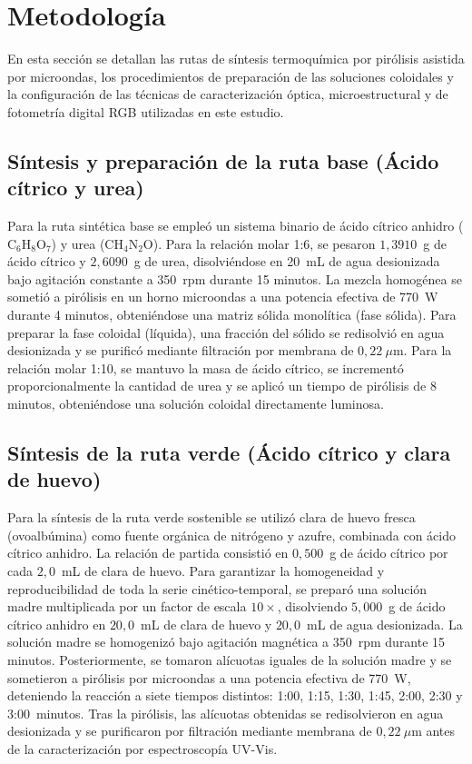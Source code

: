 \section{Metodología}

En esta sección se detallan las rutas de síntesis termoquímica por pirólisis asistida por microondas, los procedimientos de preparación de las soluciones coloidales y la configuración de las técnicas de caracterización óptica, microestructural y de fotometría digital RGB utilizadas en este estudio.

\subsection{Síntesis y preparación de la ruta base (Ácido cítrico y urea)}
Para la ruta sintética base se empleó un sistema binario de ácido cítrico anhidro ($\text{C}_6\text{H}_8\text{O}_7$) y urea ($\text{CH}_4\text{N}_2\text{O}$). Para la relación molar 1:6, se pesaron $1{,}3910$~g de ácido cítrico y $2{,}6090$~g de urea, disolviéndose en 20~mL de agua desionizada bajo agitación constante a 350~rpm durante 15 minutos. La mezcla homogénea se sometió a pirólisis en un horno microondas a una potencia efectiva de 770~W durante 4 minutos, obteniéndose una matriz sólida monolítica (fase sólida). Para preparar la fase coloidal (líquida), una fracción del sólido se redisolvió en agua desionizada y se purificó mediante filtración por membrana de $0{,}22~\mu$m.
Para la relación molar 1:10, se mantuvo la masa de ácido cítrico, se incrementó proporcionalmente la cantidad de urea y se aplicó un tiempo de pirólisis de 8 minutos, obteniéndose una solución coloidal directamente luminosa.

\subsection{Síntesis de la ruta verde (Ácido cítrico y clara de huevo)}
Para la síntesis de la ruta verde sostenible se utilizó clara de huevo fresca (ovoalbúmina) como fuente orgánica de nitrógeno y azufre, combinada con ácido cítrico anhidro. La relación de partida consistió en $0{,}500$~g de ácido cítrico por cada $2{,}0$~mL de clara de huevo. Para garantizar la homogeneidad y reproducibilidad de toda la serie cinético-temporal, se preparó una solución madre multiplicada por un factor de escala $10\times$, disolviendo $5{,}000$~g de ácido cítrico anhidro en $20{,}0$~mL de clara de huevo y $20{,}0$~mL de agua desionizada. La solución madre se homogenizó bajo agitación magnética a 350~rpm durante 15 minutos.
Posteriormente, se tomaron alícuotas iguales de la solución madre y se sometieron a pirólisis por microondas a una potencia efectiva de 770~W, deteniendo la reacción a siete tiempos distintos: 1:00, 1:15, 1:30, 1:45, 2:00, 2:30 y 3:00~minutos. Tras la pirólisis, las alícuotas obtenidas se redisolvieron en agua desionizada y se purificaron por filtración mediante membrana de $0{,}22~\mu$m antes de la caracterización por espectroscopía UV-Vis.

